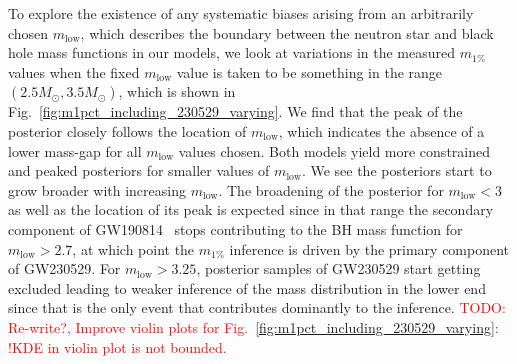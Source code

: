 \documentclass[modern]{aastex631}
\newcommand{\todo}[1]{\textcolor{red}{TODO: #1}}
\begin{document}
To explore the existence of any systematic biases arising from an arbitrarily
chosen $m_\mathrm{low}$, \chadded[id=W]{}which describes the boundary between the
neutron star and black hole mass functions in our models, we look at variations
in the measured $m_{1\%}$ values when the fixed $m_\mathrm{low}$ value is taken
to be something in the range $(2.5M_{\odot},3.5M_{\odot})$, which is shown in
Fig.~\ref{fig:m1pct_including_230529_varying}. We find that the peak of the
posterior closely follows the location of $m_\mathrm{low}$, which indicates the
absence of a lower mass-gap for all $m_\mathrm{low}$ values chosen. Both models
yield more constrained and peaked posteriors for smaller values of
$m_{\mathrm{low}}$. We see the posteriors start to grow broader with increasing
$m_\mathrm{low}$. The broadening of the posterior for $m_\mathrm{low}<3$ as well
as the location of its peak is expected since in that range the secondary
component of GW190814~\citep{LIGOScientific:2020zkf} stops contributing to the
BH mass function for $m_\mathrm{low}>2.7$, \chreplaced[id=W]{}{} at which point
the $m_{1\%}$ inference is driven by the primary component of
GW230529. For  $m_\mathrm{low}>3.25$, posterior samples of GW230529 start
getting excluded leading to weaker inference of the mass distribution in the
lower end since that is the only event that contributes dominantly to the
inference. \todo{Re-write?, Improve violin plots for
Fig.~\ref{fig:m1pct_including_230529_varying}: !KDE in violin plot is not
bounded.}


\end{document}
